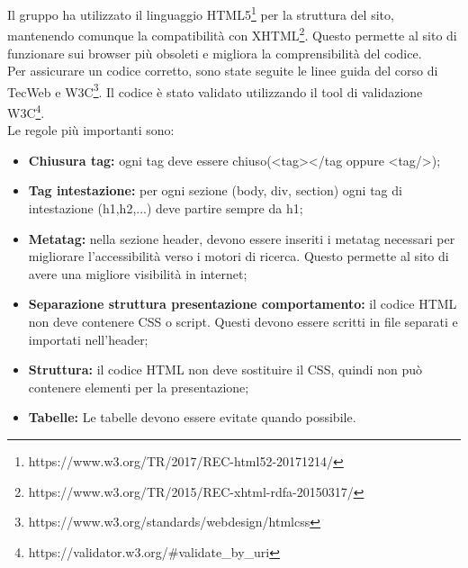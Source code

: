 Il gruppo ha utilizzato il linguaggio HTML5\footnote{https://www.w3.org/TR/2017/REC-html52-20171214/} per la struttura del sito, mantenendo comunque la compatibilità con XHTML\footnote{https://www.w3.org/TR/2015/REC-xhtml-rdfa-20150317/}. Questo permette al sito di funzionare sui browser più obsoleti e migliora la comprensibilità del codice.\\
Per assicurare un codice corretto, sono state seguite le linee guida del corso di TecWeb e W3C\footnote{https://www.w3.org/standards/webdesign/htmlcss}. Il codice è stato validato utilizzando il tool di validazione W3C\footnote{https://validator.w3.org/\#validate\_by\_uri}.\\
Le regole più importanti sono:
\begin{itemize}
    \item \textbf{Chiusura tag:} ogni tag deve essere chiuso(<tag></tag oppure <tag/>);
    \item \textbf{Tag intestazione:} per ogni sezione (body, div, section) ogni tag di intestazione (h1,h2,...) deve partire sempre da h1;
    \item \textbf{Metatag:} nella sezione header, devono essere inseriti i metatag necessari per migliorare l'accessibilità verso i motori di ricerca. Questo permette al sito di avere una migliore visibilità in internet; 
    \item \textbf{Separazione struttura presentazione comportamento:} il codice HTML non deve contenere CSS o script. Questi devono essere scritti in file separati e importati nell'header;
    \item \textbf{Struttura:} il codice HTML non deve sostituire il CSS, quindi non può contenere elementi per la presentazione;
    \item \textbf{Tabelle:} Le tabelle devono essere evitate quando possibile.
\end{itemize} 